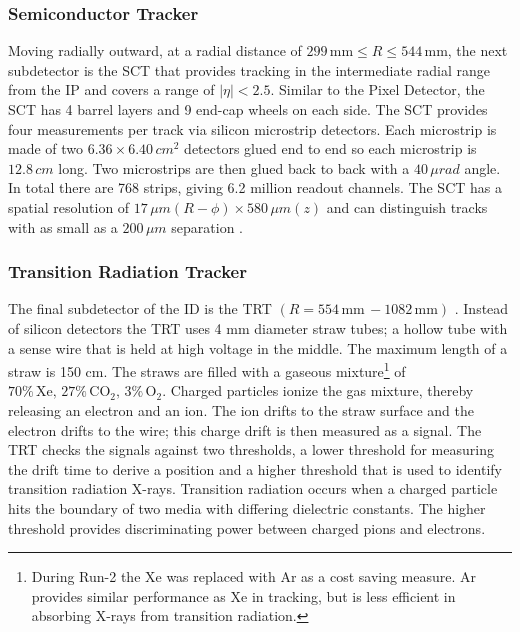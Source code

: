 		\subsubsection{Semiconductor Tracker}\label{sssec:SCT}
			Moving radially outward, at a radial distance of $299 \, \mathrm{mm} \leq R \leq 544 \, \mathrm{mm}$, the next subdetector is the \gls{SCT} that provides tracking in the intermediate radial range from the \gls{IP} and covers a range of $|\eta| < 2.5$. Similar to the Pixel Detector, the \gls{SCT} has 4 barrel layers and 9 end-cap wheels on each side. The \gls{SCT} provides four measurements per track via silicon microstrip detectors. Each microstrip is made of two $6.36 \times 6.40 \, cm^2$ detectors glued end to end so each microstrip is $12.8 \, cm$ long. Two microstrips are then glued back to back with a $40 \, \mu rad$ angle. In total there are 768 strips, giving 6.2 million readout channels. The \gls{SCT} has a spatial resolution of $17 \, \mu m (R-\phi) \times 580 \,\mu m (z)$ and can distinguish tracks with as small as a $200 \, \mu m$ separation \cite{ATLAS-ID}.

		\subsubsection{Transition Radiation Tracker}\label{sssec:TRT}
			The final subdetector of the \gls{ID} is the \gls{TRT} $(R=554 \, \mathrm{mm} \, - 1082 \, \mathrm{mm})$ . Instead of silicon detectors the \gls{TRT} uses 4 mm diameter straw tubes; a hollow tube with a sense wire that is held at high voltage in the middle. The maximum length of a straw is 150 cm. The straws are filled with a gaseous mixture\footnote{During Run-2 the Xe was replaced with Ar as a cost saving measure. Ar provides similar performance as Xe in tracking, but is less efficient in absorbing X-rays from transition radiation.} of $70\% \, \mathrm{Xe,} \, 27\% \, \mathrm{CO}_2, \, 3\% \, \mathrm{O}_2$. Charged particles ionize the gas mixture, thereby releasing an electron and an ion. The ion drifts to the straw surface and the electron drifts to the wire; this charge drift is then measured as a signal. The \gls{TRT} checks the signals against two thresholds, a lower threshold for measuring the drift time to derive a position and a higher threshold that is used to identify transition radiation X-rays. Transition radiation occurs when a charged particle hits the boundary of two media with differing dielectric constants. The higher threshold provides discriminating power between charged pions and electrons.

